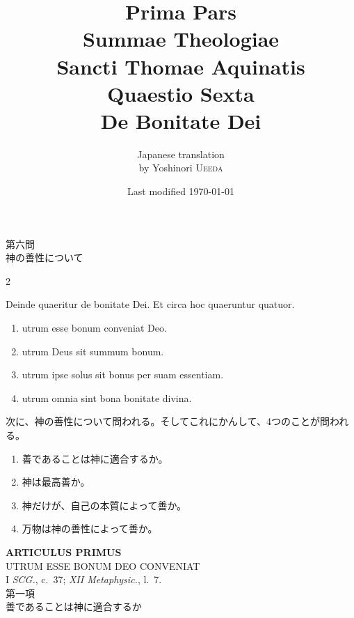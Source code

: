 \documentclass[paper=a4paper,fontsize=10pt,jafontsize=9pt,titlepage]{jlreq}
\title{{\bfseries Prima Pars}\\{\Huge Summae Theologiae}\\Sancti Thomae
Aquinatis\\Quaestio Sexta\\{\bfseries De Bonitate Dei}}
\author{Japanese translation\\by Yoshinori {\scshape Ueeda}}
\date{Last modified \today}
\begin{document}
\maketitle

\begin{center}
 {\Large 第六問\\神の善性について}
\end{center}

\begin{paracol}{2}

Deinde quaeritur de bonitate Dei. Et circa hoc quaeruntur quatuor. 
\begin{enumerate}
 \item utrum esse bonum conveniat Deo.
 \item utrum Deus sit summum bonum.
 \item utrum ipse solus sit bonus per suam essentiam.
 \item utrum omnia sint bona bonitate divina.
\end{enumerate}

\switchcolumn

次に、神の善性について問われる。そしてこれにかんして、4つのことが問われ
 る。
\begin{enumerate}
 \item 善であることは神に適合するか。
 \item 神は最高善か。
 \item 神だけが、自己の本質によって善か。
 \item 万物は神の善性によって善か。
\end{enumerate}

\end{paracol}

\newpage
{}

\begin{center}
 {\Large {\bfseries ARTICULUS PRIMUS}}\\
 {\large UTRUM ESSE BONUM DEO CONVENIAT}\\
 {\footnotesize I {\itshape SCG.}, c.~37; {\itshape XII Metaphysic.}, l.~7.}\\
 {\Large 第一項\\善であることは神に適合するか}
\end{center}

{}
\setcounter{section}{1}
\setcounter{subsection}{0}
\end{document}
